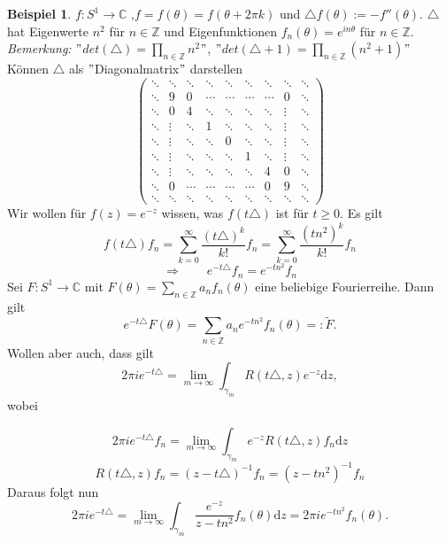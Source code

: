 \documentclass[11pt,titlepage]{article}
\theoremstyle{definition}
\newtheorem{example}[theorem]{Beispiel}
\theoremstyle{remark}
\begin{document}
	\begin{example}
		$f:S^1\to\mathbb{C}$ ,$f=f(\theta)=f(\theta +2\pi k)$ und $\triangle f(\theta):=-f''(\theta)$.
		$\triangle$ hat Eigenwerte $n^2$ für $n\in\mathbb{Z}$ und Eigenfunktionen 
		$f_n(\theta)=e^{in\theta}$ für $n\in\mathbb{Z}$. \\
		\textsl{Bemerkung:} $"$$det(\triangle)=\prod_{n\in\mathbb{Z}} n^2$$"$, 
		$"$$det(\triangle +1)=\prod_{n\in\mathbb{Z}} (n^2 +1)$$"$ \\
		Können $\triangle$ als $"$Diagonalmatrix$"$ darstellen
		\[ \begin{pmatrix} \ddots & \ddots & \ddots & \ddots & \ddots & \ddots & \ddots & \ddots & \ddots \\
					  \ddots & 9 & 0 & \cdots & \cdots & \cdots & \cdots & 0 & \ddots \\
					  \ddots & 0 & 4 & \ddots & \ddots & \ddots & \ddots & \vdots & \ddots \\
					  \ddots & \vdots & \ddots & 1 & \ddots & \ddots & \ddots & \vdots & \ddots \\
					  \ddots & \vdots & \ddots & \ddots & 0 & \ddots & \ddots & \vdots & \ddots \\
					  \ddots & \vdots & \ddots & \ddots & \ddots & 1 & \ddots & \vdots & \ddots \\
					  \ddots & \vdots & \ddots & \ddots & \ddots & \ddots & 4 & 0 & \ddots \\
					  \ddots & 0 & \cdots & \cdots & \cdots & \cdots & 0 & 9 & \ddots \\
					  \ddots & \ddots & \ddots & \ddots & \ddots & \ddots & \ddots & \ddots & \ddots
		\end{pmatrix} \]
		Wir wollen für $f(z)=e^{-z}$ wissen, was $f(t\triangle)$ ist für $t\geq 0$. Es gilt 
		\[ f(t\triangle)f_n =\sum_{k=0}^{\infty} \frac{(t\triangle)^k}{k!} f_n =\sum_{k=0}^{\infty} 
		\frac{(tn^2)^k}{k!}f_n \]
		\[\Rightarrow\qquad e^{-t \triangle}f_n =e^{-tn^2}f_n \]
		Sei $F:S^1\to\mathbb{C}$ mit $F(\theta)=\sum_{n\in\mathbb{Z}} a_n f_n(\theta)$ eine beliebige 
		Fourierreihe. Dann gilt
		\[  e^{-t\triangle} F(\theta)=\sum_{n\in\mathbb{Z}}a_n e^{-tn^2}f_n(\theta)=: \tilde{F}.\]
		Wollen aber auch, dass gilt 
		\[ 2\pi i e^{-t\triangle}=\lim_{m\to\infty} \int_{\gamma_m} R(t\triangle,z)e^{-z}\mathrm{d}z, \]
		wobei
		
		
		\[ 2\pi i e^{-t\triangle}f_n=\lim_{m\to\infty}\int_{\gamma_m} e^{-z}R(t\triangle,z)f_n\mathrm{d}z \]
		\[ R(t\triangle,z)f_n=(z-t\triangle)^{-1}f_n = (z-tn^2)^{-1}f_n \]
		Daraus folgt nun
		\[ 2\pi i e^{-t\triangle}=\lim_{m\to\infty}\int_{\gamma_m}\frac{e^{-z}}{z-tn^2}f_n(\theta)\mathrm{d}z 
		= 2\pi i e^{-tn^2}f_n(\theta). \]
	\end{example}
	
\end{document}
